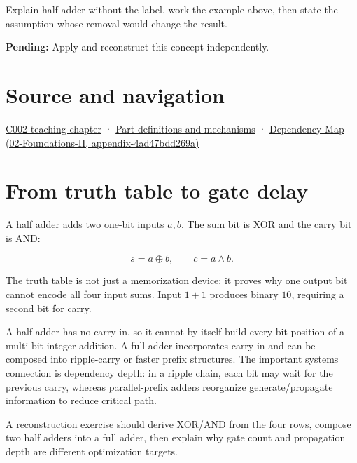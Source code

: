 Explain half adder without the label, work the example above, then state the assumption whose removal would change the result.

\textbf{Pending:} Apply and reconstruct this concept independently.

\section{Source and navigation}\label{appendix-1652d27a8e90-source-and-navigation}

\href{Continuous\%20Notes/Computing\%20Foundations\%20-\%20From\%20Bits\%20to\%20C++\%20and\%20Systems\%20APIs\#Arithmetic\%20becomes\%20a\%20policy}{C002 teaching chapter} · \hyperref[appendix-fd090d982a15]{Part definitions and mechanisms} · \href{../02-Foundations-II/main.pdf\#nameddest=appendix-4ad47bdd269a}{Dependency Map (02-Foundations-II, appendix-4ad47bdd269a)}

\section{From truth table to gate delay}\label{appendix-1652d27a8e90-from-truth-table-to-gate-delay}

A half adder adds two one-bit inputs \(a,b\). The sum bit is XOR and the carry bit is AND:

\[
s=a\oplus b,\qquad c=a\land b.
\]

The truth table is not just a memorization device; it proves why one output bit cannot encode all four input sums. Input \(1+1\) produces binary \(10\), requiring a second bit for carry.

A half adder has no carry-in, so it cannot by itself build every bit position of a multi-bit integer addition. A full adder incorporates carry-in and can be composed into ripple-carry or faster prefix structures. The important systems connection is dependency depth: in a ripple chain, each bit may wait for the previous carry, whereas parallel-prefix adders reorganize generate/propagate information to reduce critical path.

A reconstruction exercise should derive XOR/AND from the four rows, compose two half adders into a full adder, then explain why gate count and propagation depth are different optimization targets.
